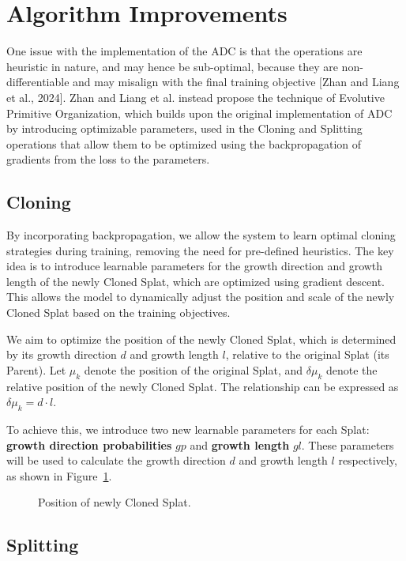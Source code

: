 \documentclass[11pt]{report}
\begin{document}
\section{Algorithm Improvements}
One issue with the implementation of the ADC is that the operations are heuristic in nature, and may hence be sub-optimal, because they are non-differentiable and may misalign with the final training objective [Zhan and Liang et al., 2024]. Zhan and Liang et al. instead propose the technique of Evolutive Primitive Organization, which builds upon the original implementation of ADC by introducing optimizable parameters, used in the Cloning and Splitting operations that allow them to be optimized using the backpropagation of gradients from the loss to the parameters. 

\subsection{Cloning}

By incorporating backpropagation, we allow the system to learn optimal cloning strategies during training, removing the need for pre-defined heuristics. The key idea is to introduce learnable parameters for the growth direction and growth length of the newly Cloned Splat, which are optimized using gradient descent. This allows the model to dynamically adjust the position and scale of the newly Cloned Splat based on the training objectives.

We aim to optimize the position of the newly Cloned Splat, which is determined by its growth direction $d$ and growth length $l$, relative to the original Splat (its Parent). Let $\mu_k$ denote the position of the original Splat, and $\delta \mu_k$ denote the relative position of the newly Cloned Splat. The relationship can be expressed as $\delta \mu_k = d \cdot l$.

To achieve this, we introduce two new learnable parameters for each Splat: \textbf{growth direction probabilities} $gp$ and \textbf{growth length} $gl$. These parameters will be used to calculate the growth direction $d$ and growth length $l$ respectively, as shown in Figure~\ref{fig:clone}.

\begin{figure}[ht]
    \centering
    
    \caption{Position of newly Cloned Splat.}
    \label{fig:clone}
\end{figure}

\subsection{Splitting}
\end{document}
